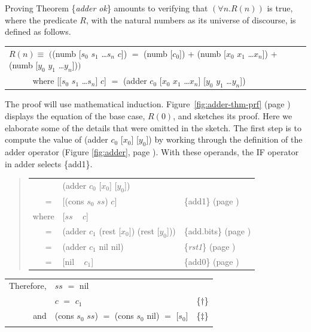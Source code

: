 Proving Theorem \{\emph{adder ok}\} amounts to
verifying that $(\forall n.R(n))$ is true,
where the predicate $R$, with the natural numbers as
its universe of discourse, is defined as follows.
\begin{center}
\begin{tabular}{l}
$R(n) \equiv$ $($(numb [$s_0$ $s_1$ \dots $s_{n}$ $c$]) $=$
(numb [$c_0$]) + (numb [$x_0$ $x_1$ \dots $x_{n}$]) + (numb [$y_0$ $y_1$ \dots $y_{n}$])$)$ \\
~~~~~ where [[$s_0$ $s_1$ \dots $s_{n}$] $c$] $=$ (adder $c_0$ [$x_0$ $x_1$ \dots $x_{n}$] [$y_0$ $y_1$ \dots $y_{n}$])\\
\end{tabular}
\end{center}

The proof will use mathematical induction.
Figure~\ref{fig:adder-thm-prf} (page \pageref{fig:adder-thm-prf})
displays the equation of the base case, $R(0)$,
and sketches its proof. Here we elaborate some of the details
that were omitted in the sketch.
The first step is
to compute the value of (adder $c_0$ [$x_0$] [$y_0$])
by working through the definition of the adder operator
(Figure \ref{fig:adder}, page \pageref{fig:adder}).
With these operands, the IF operator in adder
selects \{add1\}.
\begin{quote}
\begin{tabular}{rll}
       & (adder $c_0$ [$x_0$] [$y_0$])               & \\
\vspace{1mm}
$=$    & [(cons $s_0$ $ss$) $c$]                     & \{add1\} (page \pageref {fig:adder})  \\
where  & [$ss$ ~ $c$]                                & \\
$=$    & (adder $c_1$ (rest [$x_0$]) (rest [$y_0$])) & \{add.bits\} (page \pageref {fig:adder}) \\
$=$    & (adder $c_1$ nil nil)                       & \{\emph{rst1}\} (page \pageref {rst1}) \\
$=$    & [nil ~ $c_1$]                               & \{add0\} (page \pageref {fig:adder}) \\
\end{tabular}
\end{quote}
\setlength{\tabcolsep}{1mm}
\begin{tabular}{rll}
Therefore, & $ss$ $=$ nil                                       & \\
           & $c$ $=$ $c_1$                                      & \{$\dagger$\} \\
and        & (cons $s_0$ $ss$) $=$ (cons $s_0$ nil) $=$ [$s_0$] & \{$\ddagger$\}\\
           &                                                    & \\
\end{tabular}

